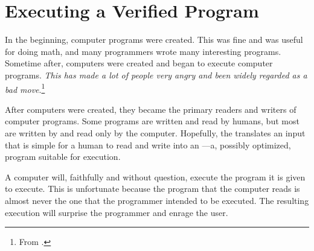 \newcommand{\FigThisCompiler}[1][t]{
  \begin{figure}[#1]
    \begin{center}
    \begin{tikzcd}[ampersand replacement=\&]
      ECC^D \arrow[d, "\text{\fullref[ANF]{chp:anf}}"'] \&  \&  \& CoC^D \arrow[d, "\text{\fullref[CPS]{chp:cps}}"'] \arrow[dd, "\text{\fullref[Parametric CC]{chp:param-cc}}", bend left=60] \\
      ECC^A \arrow[d, "\text{\fullref[Abstract CC]{chp:abs-cc}}"'] \&  \& \& CoC^k  \\
      ECC^{CC} \&  \& \& CoC^{CC}%
    \end{tikzcd}
    \end{center}
    \caption{Compilers in this Dissertation}
    \label{fig:intro:thiscompiler}
  \end{figure}
}

\chapter{Executing a Verified Program}
\label{chp:intro}

In the beginning, computer programs were created.
This was fine and was useful for doing math, and many programmers wrote many
interesting programs.
Sometime after, computers were created and began to execute computer programs.
\emph{This has made a lot of people very angry and been widely regarded as a bad
  move}.\footnote{From \citet{adams1980}.}

After computers were created, they became the primary readers and writers of
computer programs.
Some programs are written and read by humans, but most are written by
and read only by the computer.
Hopefully, the  translates an input 
that is simple for a human to read and write into an ---a,
possibly optimized, program suitable for execution.

A computer will, faithfully and without question, execute the program it is
given to execute.
This is unfortunate because the program that the computer reads is almost never
the one that the programmer intended to be executed.
The resulting execution will surprise the programmer and enrage the user.

